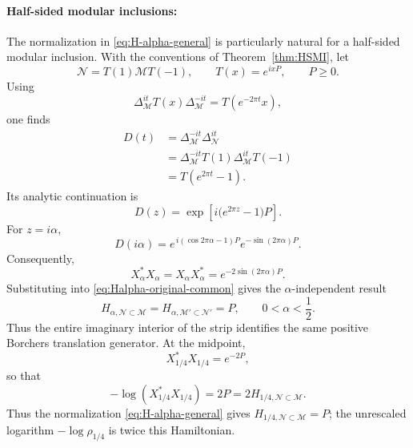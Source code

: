 \documentclass[a4paper,11pt]{article}
\theoremstyle{definition}
\newcommand{\mN}{\mathcal{N}}
\newcommand{\mM}{\mathcal{M}}
\begin{document}
\paragraph{Half-sided modular inclusions:} The normalization in \eqref{eq:H-alpha-general} is particularly natural for
a half-sided modular inclusion. With the conventions of
Theorem~\ref{thm:HSMI}, let
\begin{equation}
    \mN
    =
    T(1)\mM T(-1),
    \qquad
    T(x)=e^{ixP},
    \qquad
    P\geq0 .
\end{equation}
Using
\begin{equation}
    \Delta_{\mM}^{it}
    T(x)
    \Delta_{\mM}^{-it}
    =
    T(e^{-2\pi t}x),
\end{equation}
one finds
\begin{align}
    D(t)
    &=
    \Delta_{\mM}^{-it}\Delta_{\mN}^{it}
    \nonumber\\
    &=
    \Delta_{\mM}^{-it}
    T(1)\Delta_{\mM}^{it}T(-1)
    \nonumber\\
    &=
    T(e^{2\pi t}-1).
    \label{eq:D-HSMI-explicit}
\end{align}
Its analytic continuation is
\begin{equation}
    D(z)
    =
    \exp\left[
        i\bigl(e^{2\pi z}-1\bigr)P
    \right].
    \label{eq:D-HSMI-complex}
\end{equation}
For $z=i\alpha$,
\begin{equation}
    D(i\alpha)
    =
    e^{\,i(\cos 2\pi\alpha-1)P}
    e^{-\sin(2\pi\alpha)P}.
\end{equation}
Consequently,
\begin{equation}
    X_\alpha^*X_\alpha
    =
    X_\alpha X_\alpha^*
    =
    e^{-2\sin(2\pi\alpha)P}.
    \label{eq:rho-HSMI-alpha}
\end{equation}
Substituting into \eqref{eq:Halpha-original-common} gives the
$\alpha$-independent result
\begin{equation}
    \boxed{
    H_{\alpha,\mN\subset\mM}
    =
    H_{\alpha,\mM'\subset\mN'}
    =
    P,
    \qquad
    0<\alpha<\frac12 .
    }
    \label{eq:Halpha-HSMI-P}
\end{equation}
Thus the entire imaginary interior of the strip identifies the same positive
Borchers translation generator. At the midpoint,
\begin{equation}
    X_{1/4}^*X_{1/4}=e^{-2P},
\end{equation}
so that
\begin{equation}
    -\log(X_{1/4}^*X_{1/4})=2P=2H_{1/4,\mN\subset\mM}.
\end{equation}
Thus the normalization \eqref{eq:H-alpha-general} gives
$H_{1/4,\mN\subset\mM}=P$; the unrescaled logarithm $-\log\rho_{1/4}$ is twice
this Hamiltonian.
\end{document}
